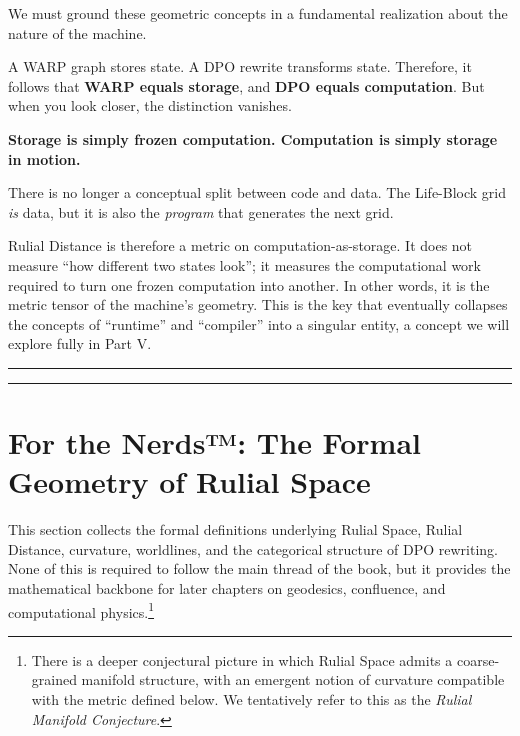 We must ground these geometric concepts in a fundamental realization about the nature of the machine.

A WARP graph stores state. A DPO rewrite transforms state. Therefore, it follows that \textbf{WARP equals storage}, and \textbf{DPO equals computation}. But when you look closer, the distinction vanishes.

\textbf{Storage is simply frozen computation. Computation is simply storage in motion.}

There is no longer a conceptual split between code and data. The Life-Block grid \emph{is} data, but it is also the \emph{program} that generates the next grid.

Rulial Distance is therefore a metric on computation-as-storage. It does not measure ``how different two states look''; it measures the computational work required to turn one frozen computation into another. In other words, it is the metric tensor of the machine's geometry. This is the key that eventually collapses the concepts of ``runtime'' and ``compiler'' into a singular entity, a concept we will explore fully in Part V.

\vspace{1em}
\begin{center}
\end{center}

\vspace{1.5em}

\begin{center}
\rule{0.4\linewidth}{0.5pt} \raisebox{-2.5pt}{$\boldsymbol{\Omega}$} \rule{0.4\linewidth}{0.5pt}
\end{center}

\section*{For the Nerds™: The Formal Geometry of Rulial Space}

\begin{center}
\begin{minipage}{0.92\linewidth}
This section collects the formal definitions underlying Rulial Space, Rulial Distance, curvature, worldlines, and the categorical structure of DPO rewriting. None of this is required to follow the main thread of the book, but it provides the mathematical backbone for later chapters on geodesics, confluence, and computational physics.\footnote{There is a deeper conjectural picture in which Rulial Space admits a coarse-grained manifold structure, with an emergent notion of curvature compatible with the metric defined below. We tentatively refer to this as the \emph{Rulial Manifold Conjecture}.}
\end{minipage}
\end{center}

